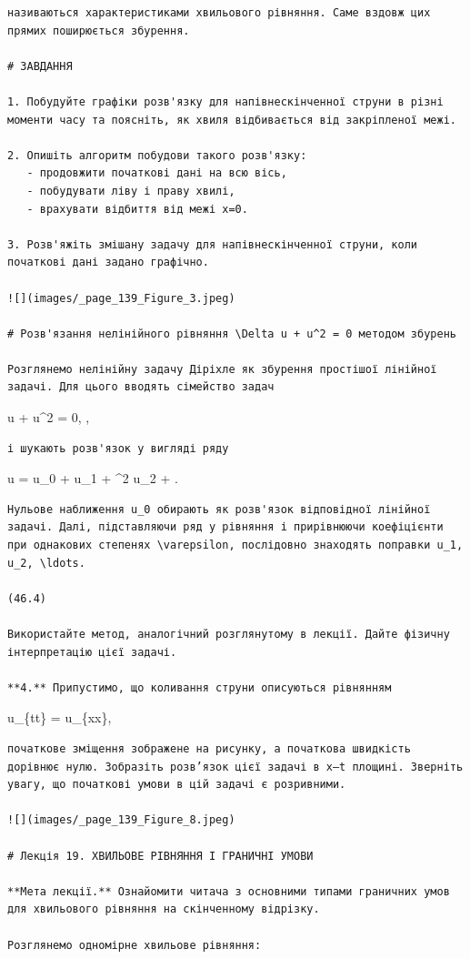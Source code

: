 \documentclass[
  ukrainian,
]{article}
\begin{document}
\begin{verbatim}
називаються характеристиками хвильового рівняння. Саме вздовж цих прямих поширюється збурення.

# ЗАВДАННЯ

1. Побудуйте графіки розв'язку для напівнескінченної струни в різні моменти часу та поясніть, як хвиля відбивається від закріпленої межі.

2. Опишіть алгоритм побудови такого розв'язку:
   - продовжити початкові дані на всю вісь,
   - побудувати ліву і праву хвилі,
   - врахувати відбиття від межі x=0.

3. Розв'яжіть змішану задачу для напівнескінченної струни, коли початкові дані задано графічно.

![](images/_page_139_Figure_3.jpeg)

# Розв'язання нелінійного рівняння \Delta u + u^2 = 0 методом збурень

Розглянемо нелінійну задачу Діріхле як збурення простішої лінійної задачі. Для цього вводять сімейство задач
\end{verbatim}

\Delta u + \varepsilon u\^{}2 = 0,  \le \varepsilon {},

\begin{verbatim}
і шукають розв'язок у вигляді ряду
\end{verbatim}

u = u\_0 + \varepsilon u\_1 + \varepsilon\^{}2 u\_2 + \cdots .

\begin{verbatim}
Нульове наближення u_0 обирають як розв'язок відповідної лінійної задачі. Далі, підставляючи ряд у рівняння і прирівнюючи коефіцієнти при однакових степенях \varepsilon, послідовно знаходять поправки u_1, u_2, \ldots.

(46.4)

Використайте метод, аналогічний розглянутому в лекції. Дайте фізичну інтерпретацію цієї задачі.

**4.** Припустимо, що коливання струни описуються рівнянням
\end{verbatim}

u\_\{tt\} = u\_\{xx\},

\begin{verbatim}
початкове зміщення зображене на рисунку, а початкова швидкість дорівнює нулю. Зобразіть розв’язок цієї задачі в x–t площині. Зверніть увагу, що початкові умови в цій задачі є розривними.

![](images/_page_139_Figure_8.jpeg)

# Лекція 19. ХВИЛЬОВЕ РІВНЯННЯ І ГРАНИЧНІ УМОВИ

**Мета лекції.** Ознайомити читача з основними типами граничних умов для хвильового рівняння на скінченному відрізку.

Розглянемо одномірне хвильове рівняння:
\end{verbatim}
\end{document}

